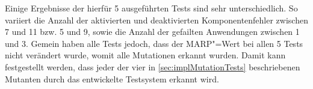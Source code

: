 Einige Ergebnisse der hierfür 5 ausgeführten Tests sind sehr unterschiedlich.
So variiert die Anzahl der aktivierten und deaktivierten Komponentenfehler zwischen 7 und 11 bzw. 5 und 9, sowie die Anzahl der gefailten Anwendungen zwischen 1 und 3.
Gemein haben alle Tests jedoch, dass der \ac{MARP}"=Wert bei allen 5 Tests nicht verändert wurde, womit alle Mutationen erkannt wurden.
Damit kann festgestellt werden, dass jeder der vier in \cref{sec:implMutationTests} beschriebenen Mutanten durch das entwickelte Testsystem erkannt wird.

